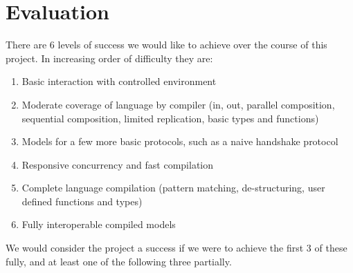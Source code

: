 \section{Evaluation}

There are 6 levels of success we would like to achieve over the course of this project. In increasing order of difficulty they are:
\begin{enumerate}
    \item Basic interaction with controlled environment
    \item Moderate coverage of language by compiler (in, out, parallel composition, sequential composition, limited replication, basic types and functions) 
    \item Models for a few more basic protocols, such as a naive handshake protocol
    \item Responsive concurrency and fast compilation
    \item Complete language compilation (pattern matching, de-structuring, user defined functions and types)
    \item Fully interoperable compiled models
\end{enumerate}

We would consider the project a success if we were to achieve the first 3 of these fully, and at least one of the following three partially.

